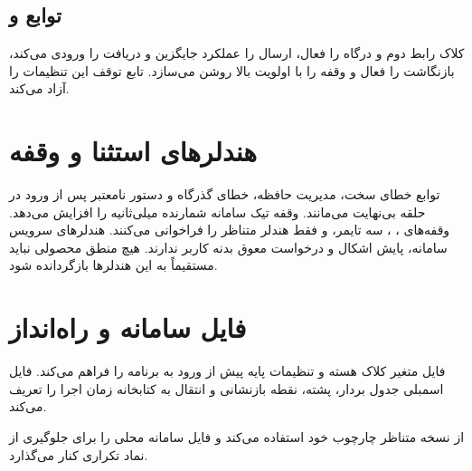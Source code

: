 \subsection{توابع  و }
کلاک رابط دوم و درگاه
را فعال، ارسال
را عملکرد جایگزین و دریافت
را ورودی می‌کند، بازنگاشت را فعال و وقفه
را با اولویت بالا روشن می‌سازد. تابع توقف این تنظیمات را آزاد می‌کند.

\section{هندلرهای استثنا و وقفه}
توابع خطای سخت، مدیریت حافظه، خطای گذرگاه و دستور نامعتبر پس از ورود در حلقه بی‌نهایت می‌مانند. وقفه تیک سامانه شمارنده میلی‌ثانیه
را افزایش می‌دهد. وقفه‌های
،
،
سه تایمر،
و
فقط هندلر
متناظر را فراخوانی می‌کنند. هندلرهای سرویس سامانه، پایش اشکال و درخواست معوق بدنه کاربر ندارند. هیچ منطق محصولی نباید مستقیماً به این هندلرها بازگردانده شود.

\section{فایل سامانه و راه‌انداز}
فایل
متغیر کلاک هسته و تنظیمات پایه پیش از ورود به برنامه را فراهم می‌کند. فایل اسمبلی
جدول بردار، پشته، نقطه بازنشانی و انتقال به کتابخانه زمان اجرا را تعریف می‌کند.
\par\noindent
{}
از نسخه متناظر چارچوب خود استفاده می‌کند و فایل سامانه محلی را برای جلوگیری از نماد تکراری کنار می‌گذارد.
